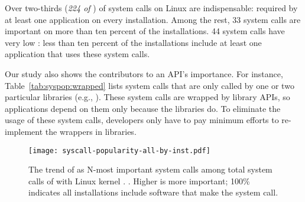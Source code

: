 Over two-thirds ({\em 224 of \syscallnum{}}) 
of system calls on Linux are indispensable:
required by 
at least one application on every installation.
Among the rest, 33 system calls are important on more than ten percent of the installations.
44 system calls have very low \usagemetric{}:
less than ten percent of the installations include at least one application
that uses these system calls.

Our study also shows the contributors
to an API's importance. %
For instance, Table~\ref{tab:syspop:wrapped} lists system calls that are
only called by one or two particular libraries
(e.g., \libc{}).
These system calls are wrapped by library APIs,
so applications depend on them only because the libraries do.
To eliminate the usage of these system calls,
developers only have to pay minimum efforts to re-implement the wrappers in libraries.

\begin{figure}[t]
\centering
\texttt{[image: syscall-popularity-all-by-inst.pdf]}
\caption[N-most important system calls in Linux.]
{The trend of \usagemetric{} as N-most important system calls among total \syscallnum{} system calls of \osversion{} with Linux kernel . .
Higher is more important; 100\% indicates all installations include software that make the system call.}
\label{fig:syscall-popularity-trend}
\end{figure}

